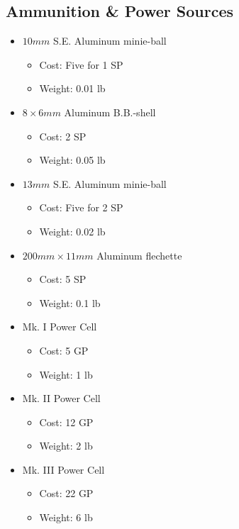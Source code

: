 \documentclass[12pt, landscape]{article}
\begin{document}
\begin{FlushLeft}
\begin{multicols}{2}
			\subsection{Ammunition \& Power Sources}
			\begin{itemize}
				\item $10mm$ S.E. Aluminum minie-ball
				\begin{itemize}
					\item Cost: Five for 1 SP
					\item Weight: 0.01 lb
				\end{itemize}
				\item $8 \times 6mm$ Aluminum B.B.-shell
				\begin{itemize}
					\item Cost: 2 SP
					\item Weight: 0.05 lb
				\end{itemize}
				\item $13mm$ S.E. Aluminum minie-ball
				\begin{itemize}
					\item Cost: Five for 2 SP
					\item Weight: 0.02 lb
				\end{itemize}
				\item $200mm \times 11mm$ Aluminum flechette
				\begin{itemize}
					\item Cost: 5 SP
					\item Weight: 0.1 lb
				\end{itemize}
				\item Mk. I Power Cell
				\begin{itemize}
					\item Cost: 5 GP
					\item Weight: 1 lb
				\end{itemize}
				\item Mk. II Power Cell
				\begin{itemize}
					\item Cost: 12 GP
					\item Weight: 2 lb
				\end{itemize}
				\item Mk. III Power Cell
				\begin{itemize}
					\item Cost: 22 GP
					\item Weight: 6 lb
				\end{itemize}
			\end{itemize}
		\end{multicols}
	\end{FlushLeft}
\end{document}
